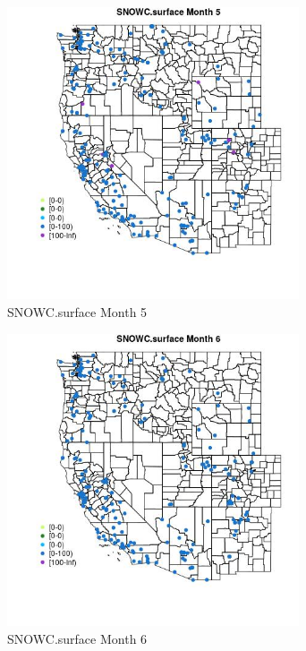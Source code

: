 \begin{figure} 
\centering  
\includegraphics[width=0.77\textwidth]{Code_Outputs/Report_ML_input_PM25_Step4_part_e_de_duplicated_aveswNAs_MapObsMo5SNOWCsurface.jpg} 
\caption{\label{fig:Report_ML_input_PM25_Step4_part_e_de_duplicated_aveswNAsMapObsMo5SNOWCsurface}SNOWC.surface Month 5} 
\end{figure} 
 

\begin{figure} 
\centering  
\includegraphics[width=0.77\textwidth]{Code_Outputs/Report_ML_input_PM25_Step4_part_e_de_duplicated_aveswNAs_MapObsMo6SNOWCsurface.jpg} 
\caption{\label{fig:Report_ML_input_PM25_Step4_part_e_de_duplicated_aveswNAsMapObsMo6SNOWCsurface}SNOWC.surface Month 6} 
\end{figure} 
 

